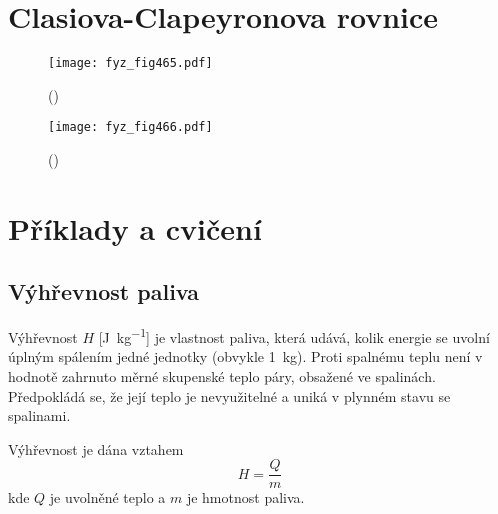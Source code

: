   \section{Clasiova-Clapeyronova rovnice}\label{fyz:IchapXLVsecIII}
  
    \begin{figure}[ht!] %
      \centering
      \texttt{[image: fyz\_fig465.pdf]}
      \caption{ 
              (\cite[s.~707]{Feynman01})}
      \label{fyz:fig465}
    \end{figure}

    \begin{figure}[ht!] %
      \centering
      \texttt{[image: fyz\_fig466.pdf]}
      \caption{ 
              (\cite[s.~707]{Feynman01})}
      \label{fyz:fig466}
    \end{figure}
  \section{Příklady a cvičení}\label{fyz:IchapXLVsecIV}
    \subsection{Výhřevnost paliva}\label{fyz:IchapXLVsecIVssecI}
      Výhřevnost \(H\) [\si{\joule\per\kg}] je vlastnost paliva, která udává, kolik energie se
      uvolní úplným spálením jedné jednotky (obvykle \SI{1}{\kg}). Proti spalnému teplu není v
      hodnotě zahrnuto měrné skupenské teplo páry, obsažené ve spalinách. Předpokládá se, že její
      teplo je nevyužitelné a uniká v plynném stavu se spalinami.

      Výhřevnost je dána vztahem
      \begin{equation*}
        H=\dfrac{Q}{m}
      \end{equation*}
      kde \(Q\) je uvolněné teplo a \(m\) je hmotnost paliva. 

      
      
      
      
    
